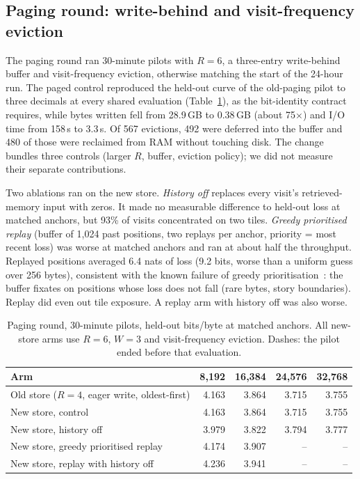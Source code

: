 \documentclass[10pt]{article}
\newcommand{\bpb}{bits/byte}
\begin{document}
\subsection{Paging round: write-behind and visit-frequency eviction}
\label{sec:paging}

The paging round ran 30-minute pilots with $R=6$, a three-entry write-behind buffer and
visit-frequency eviction, otherwise matching the start of the 24-hour run. The paged control
reproduced the held-out curve of the old-paging pilot to three decimals at every shared evaluation
(Table~\ref{tab:paging}), as the bit-identity contract requires, while bytes written fell from 28.9\,GB
to 0.38\,GB (about 75$\times$) and I/O time from 158\,s to 3.3\,s. Of 567 evictions, 492 were deferred
into the buffer and 480 of those were reclaimed from RAM without touching disk. The change bundles
three controls (larger $R$, buffer, eviction policy); we did not measure their separate contributions.

Two ablations ran on the new store. \emph{History off} replaces every visit's retrieved-memory input
with zeros. It made no measurable difference to held-out loss at matched anchors, but 93\% of visits
concentrated on two tiles. \emph{Greedy prioritised replay} (buffer of 1,024 past positions, two
replays per anchor, priority = most recent loss) was worse at matched anchors and ran at about half
the throughput. Replayed positions averaged 6.4 nats of loss (9.2 bits, worse than a uniform guess
over 256 bytes), consistent with the known failure of greedy
prioritisation~\citep{schaul2016per}: the buffer fixates on positions whose loss does not fall (rare
bytes, story boundaries). Replay did even out tile exposure. A replay arm with history off was also
worse.

\begin{table}[t]
\centering
\caption{Paging round, 30-minute pilots, held-out \bpb{} at matched anchors. All new-store arms use
$R=6$, $W=3$ and visit-frequency eviction. Dashes: the pilot ended before that evaluation.}
\label{tab:paging}
\begin{tabular}{lrrrr}
\toprule
Arm & 8,192 & 16,384 & 24,576 & 32,768 \\
\midrule
Old store ($R=4$, eager write, oldest-first) & 4.163 & 3.864 & 3.715 & 3.755 \\
New store, control & 4.163 & 3.864 & 3.715 & 3.755 \\
New store, history off & 3.979 & 3.822 & 3.794 & 3.777 \\
New store, greedy prioritised replay & 4.174 & 3.907 & -- & -- \\
New store, replay with history off & 4.236 & 3.941 & -- & -- \\
\bottomrule
\end{tabular}
\end{table}
\end{document}
